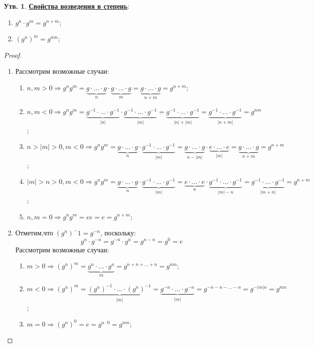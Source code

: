 \documentclass[12pt]{article}
\theoremstyle{definition}
\newtheorem{prop}{Утв.}
\begin{document}
\begin{prop}\textbf{\uline{Свойства возведения в степень}}:
	\begin{enumerate}[label=\arabic*)]
		\item $g^n{\cdot}g^m = g^{n + m}$;
		\item $(g^n)^m = g^{nm}$;
	\end{enumerate}
\end{prop}
\begin{proof}\hfill
	\begin{enumerate}[label=\arabic*)]
		\item Рассмотрим возможные случаи:
		\begin{enumerate}[label=(\arabic*)]
			\item $n, m > 0 \Rightarrow g^ng^m = \underbrace{g{\cdot}\dotsc{\cdot}g}_{n}{\cdot}\underbrace{g{\cdot}\dotsc{\cdot}g}_{m} = \underbrace{g{\cdot}\dotsc{\cdot}g}_{n + m} = g^{n + m}$;
			\item $n, m < 0 \Rightarrow g^ng^m =  \underbrace{g^{-1}{\cdot}\dotsc{\cdot}g^{-1}}_{|n|}{\cdot}\underbrace{g^{-1}{\cdot}\dotsc{\cdot}g^{-1}}_{|m|} = \underbrace{g^{-1}{\cdot}\dotsc{\cdot}g^{-1}}_{|n| + |m|} = \underbrace{g^{-1}{\cdot}\dotsc{\cdot}g^{-1}}_{|n + m|} = g^{nm}$;
			\item $n > |m| > 0, m < 0\Rightarrow g^ng^m = \underbrace{g{\cdot}\dotsc{\cdot}g}_{n}{\cdot}\underbrace{g^{-1}{\cdot}\dotsc{\cdot}g^{-1}}_{|m|} = \underbrace{g{\cdot}\dotsc{\cdot}g}_{n - |m|}{\cdot}\underbrace{e{\cdot}\dotsc{\cdot}e}_{|m|} = \underbrace{g{\cdot}\dotsc{\cdot}g}_{n + m} = g^{n + m}$;
			\item $|m| > n > 0, m < 0\Rightarrow g^ng^m = \underbrace{g{\cdot}\dotsc{\cdot}g}_{n}{\cdot}\underbrace{g^{-1}{\cdot}\dotsc{\cdot}g^{-1}}_{|m|} = \underbrace{e{\cdot}\dotsc{\cdot}e}_{n}{\cdot}\underbrace{g^{-1}{\cdot}\dotsc{\cdot}g^{-1}}_{|m| - n} = \underbrace{g^{-1}{\cdot}\dotsc{\cdot}g^{-1}}_{|m + n|} = g^{n + m}$;
			\item $n,m = 0 \Rightarrow g^ng^m = ee = e = g^{n + m}$;
		\end{enumerate}
		
		\item Отметим,что $(g^n)^-1 = g^{-n}$, поскольку: 
		$$
			g^n{\cdot}g^{-n} = g^{-n}{\cdot}g^n = g^{n - n} = g^{0} = e
		$$ 
		Рассмотрим возможные случаи:
		\begin{enumerate}[label=(\arabic*)]
			\item $m > 0 \Rightarrow (g^n)^m =  \underbrace{g^n{\cdot}\dotsc{\cdot}g^n}_{m} = g^{n + n + \dotsc  + n} = g^{nm}$;
			\item $m < 0 \Rightarrow (g^n)^m = \underbrace{(g^n)^{-1}{\cdot}\dotsc{\cdot}(g^n)^{-1}}_{|m|} =\underbrace{g^{-n}{\cdot}\dotsc{\cdot}g^{-n}}_{|m|}=  g^{-n - n - \dotsc -n} = g^{-|m|n} = g^{mn}$;
			\item $m = 0 \Rightarrow (g^n)^0 = e = g^{n{\cdot}0} = g^{nm}$;
		\end{enumerate}

	\end{enumerate}
\end{proof}
\end{document}
